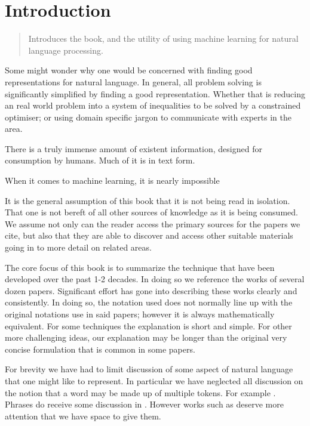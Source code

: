 \documentclass[12pt,parskip]{komatufte}
\begin{document}

\chapter{Introduction}\label{sec:introduction}
\begin{abstract}
	Introduces the book, and the utility of using machine learning for natural language processing.
\end{abstract}

Some might wonder why one would be concerned with finding good representations for natural language.
In general, all problem solving is significantly simplified by finding a good representation.
Whether that is reducing an real world problem into a system of inequalities to be solved by a constrained optimiser; or using domain specific jargon to communicate with experts in the area.


There is a truly immense amount of existent information, designed for consumption by humans.
Much of it is in text form.

When it comes to machine learning, it is nearly impossible 



It is the general assumption of this book that it is not being read in isolation.
That one is not bereft of all other sources of knowledge as it is being consumed.
We assume not only can the reader access the primary sources for the papers we cite,
but also that they are able to discover and access other suitable materials going in to more detail on related areas.

The core focus of this book is to summarize the technique that have been developed over the past 1-2 decades.
In doing so we reference the works of several dozen papers.
Significant effort has gone into describing these works clearly and consistently.
In doing so, the notation used does not normally line up with the original notations use in said papers; however it is always mathematically equivalent.
For some techniques the explanation is short and simple.
For other more challenging ideas, our explanation may be longer than the original very concise formulation that is common in some papers.





For brevity we have had to limit discussion of some aspect of natural language that one might like to represent.
In particular we have neglected all discussion on the notion that a word may be made up of multiple tokens.
For example .
Phrases do receive some discussion in .
However works such as  deserve more attention that we have space to give them.
\end{document}
